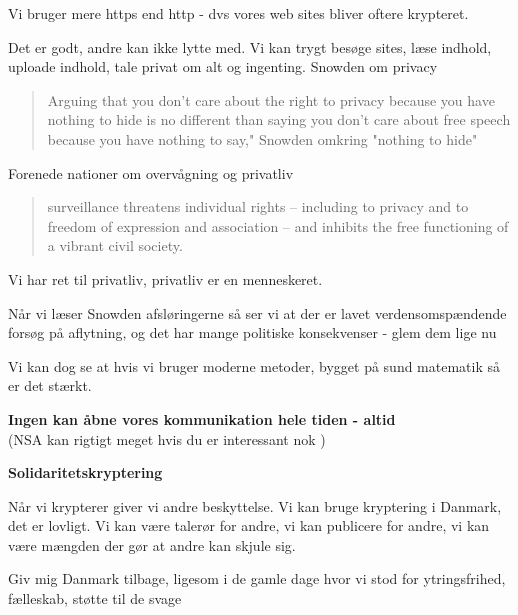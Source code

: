 \documentclass[20pt,landscape,a4paper,footrule]{foils}
\begin{document}


Vi bruger mere https end http - dvs vores web sites bliver oftere krypteret.

Det er godt, andre kan ikke lytte med. Vi kan trygt besøge sites, læse indhold, uploade indhold, tale privat om alt og ingenting.
Snowden om privacy
\begin{quote}
 Arguing that you don't care about the right to privacy because you have nothing to hide is no different than saying you don't care about free speech because you
have nothing to say," Snowden omkring "nothing to hide"
\end{quote}

Forenede nationer om overvågning og privatliv
\begin{quote} surveillance threatens individual rights – including to privacy and
 to freedom of expression and association – and inhibits the free
 functioning of a vibrant civil society.
\end{quote}

\centerline{Vi har ret til privatliv, privatliv er en menneskeret.}





Når vi læser Snowden afsløringerne så ser vi at der er lavet verdensomspændende
forsøg på aflytning, og det har mange politiske konsekvenser - glem dem lige nu

Vi kan dog se at hvis vi bruger moderne metoder, bygget på sund matematik så er det stærkt.

{\bf Ingen kan åbne vores kommunikation hele tiden - altid}\\
(NSA kan rigtigt meget hvis du er interessant nok )

{\bf Solidaritetskryptering}

Når vi krypterer giver vi andre beskyttelse. Vi kan bruge kryptering i Danmark, det er lovligt. Vi kan være talerør for andre, vi kan publicere for andre, vi kan være mængden der gør at andre kan skjule sig.

Giv mig Danmark tilbage, ligesom i de gamle dage
hvor vi stod for ytringsfrihed, fælleskab, støtte til de svage
\end{document}
